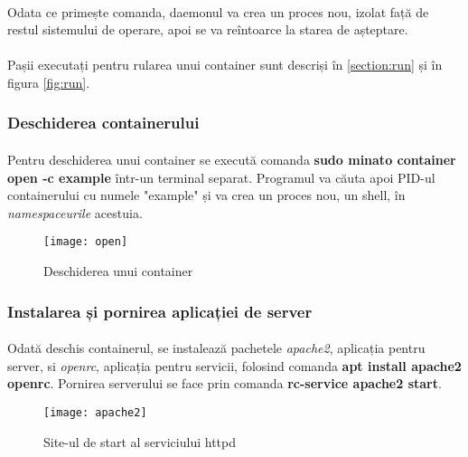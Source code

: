         \paragraph{} Odata ce primește comanda, daemonul va crea un proces nou, izolat față de restul sistemului de operare, apoi se va reîntoarce la starea de așteptare.
        \paragraph{} Pașii executați pentru rularea unui container sunt descriși în \autoref{section:run} și în figura \ref{fig:run}.

    \subsubsection{Deschiderea containerului}
        \paragraph{} Pentru deschiderea unui container se execută comanda \textbf{sudo minato container open -c example} într-un terminal separat. Programul va căuta apoi PID-ul containerului cu numele "example" și va crea un proces nou, un shell, în \textit{namespaceurile} acestuia.
        \begin{figure}[h!]
            \centering
            \texttt{[image: open]}
            \caption{Deschiderea unui container}
            \label{fig:open}
        \end{figure}

    \subsubsection{Instalarea și pornirea aplicației de server}
        \paragraph{} Odată deschis containerul, se instalează pachetele \textit{apache2}, aplicația pentru server, si \textit{openrc}, aplicația pentru servicii, folosind comanda \textbf{apt install apache2 openrc}. Pornirea serverului se face prin comanda \textbf{rc-service apache2 start}.
        \begin{figure}[h!]
            \centering
            \texttt{[image: apache2]}
            \caption{Site-ul de start al serviciului httpd}
            \label{fig:apache2}
        \end{figure}
